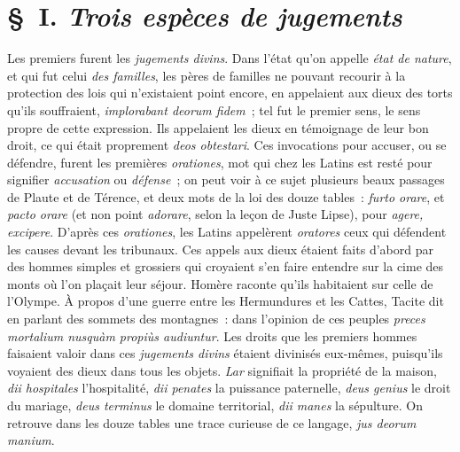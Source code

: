 \documentclass[french,twoside]{book} %
\begin{document}
\section[{§ I. Trois espèces de jugements}]{§ I. {\itshape Trois espèces de jugements}}
\noindent  Les premiers furent les {\itshape jugements divins}. Dans l’état qu’on appelle {\itshape état de nature}, et qui fut celui {\itshape des familles}, les pères de familles ne pouvant recourir à la protection des lois qui n’existaient point encore, en appelaient aux dieux des torts qu’ils souffraient, {\itshape implorabant deorum fidem} ; tel fut le premier sens, le sens propre de cette expression. Ils appelaient les dieux en témoignage de leur bon droit, ce qui était proprement {\itshape deos obtestari}. Ces invocations pour accuser, ou se défendre, furent les premières {\itshape orationes}, mot qui chez les Latins est resté pour signifier {\itshape accusation} ou {\itshape défense} ; on peut voir à ce sujet plusieurs beaux passages de Plaute et de Térence, et deux mots de la loi des douze tables : {\itshape furto orare}, et {\itshape pacto orare} (et non point {\itshape adorare}, selon la leçon de Juste Lipse), pour {\itshape agere, excipere}. D’après ces {\itshape orationes}, les Latins appelèrent  {\itshape oratores} ceux qui défendent les causes devant les tribunaux. Ces appels aux dieux étaient faits d’abord par des hommes simples et grossiers qui croyaient s’en faire entendre sur la cime des monts où l’on plaçait leur séjour. Homère raconte qu’ils habitaient sur celle de l’Olympe. À propos d’une guerre entre les Hermundures et les Cattes, Tacite dit en parlant des sommets des montagnes : dans l’opinion de ces peuples \emph{{\itshape preces mortalium nusquàm propiùs audiuntur}}. Les droits que les premiers hommes faisaient valoir dans ces {\itshape jugements divins} étaient divinisés eux-mêmes, puisqu’ils voyaient des dieux dans tous les objets. {\itshape Lar} signifiait la propriété de la maison, {\itshape dii hospitales} l’hospitalité, {\itshape dii penates} la puissance paternelle, {\itshape deus genius} le droit du mariage, {\itshape deus terminus} le domaine territorial, {\itshape dii manes} la sépulture. On retrouve dans les douze tables une trace curieuse de ce langage, \emph{{\itshape jus deorum manium}}.\par
\end{document}
